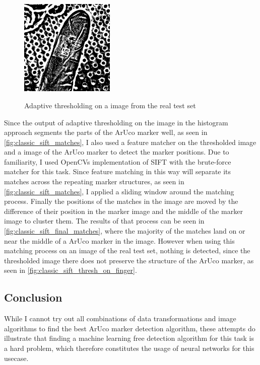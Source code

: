 \documentclass[10pt]{book}
\begin{document}
\begin{figure}
  \caption{Adaptive thresholding on a image from the real test set}
  \includegraphics[width=0.4\textwidth]{image/classic_sift_thresh_on_finger}
  \label{fig:classic_sift_thresh_on_finger}
\end{figure}

Since the output of adaptive thresholding on the image in the histogram approach segments the parts of the \ac{ArUco} marker well, as seen in \autoref{fig:classic_sift_matches}, I also used a feature matcher on the thresholded image and a image of the \ac{ArUco} marker to detect the marker positions. Due to familiarity, I used \acp{OpenCV} implementation of \ac{SIFT} with the brute-force matcher for this task. Since feature matching in this way will separate its matches across the repeating marker structures, as seen in \autoref{fig:classic_sift_matches}, I applied a sliding window around the matching process. Finally the positions of the matches in the image are moved by the difference of their position in the marker image and the middle of the marker image to cluster them. The results of that process can be seen in \autoref{fig:classic_sift_final_matches}, where the majority of the matches land on or near the middle of a \ac{ArUco} marker in the image. However when using this matching process on an image of the real test set, nothing is detected, since the thresholded image there does not preserve the structure of the \ac{ArUco} marker, as seen in \autoref{fig:classic_sift_thresh_on_finger}.

\subsection{Conclusion}

While I cannot try out all combinations of data transformations and image algorithms to find the best \ac{ArUco} marker detection algorithm, these attempts do illustrate that finding a machine learning free detection algorithm for this task is a hard problem, which therefore constitutes the usage of neural networks for this usecase.
\end{document}
